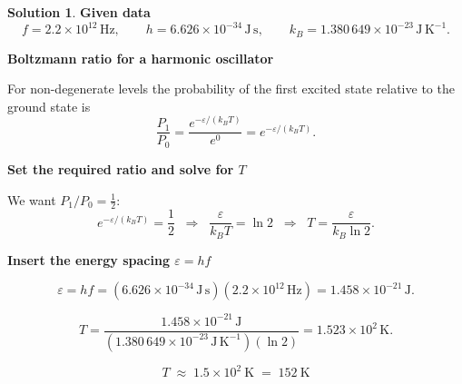 \documentclass[12pt]{article}
\theoremstyle{definition} %
\newtheorem{solution}{Solution}
\theoremstyle{plain} %
\begin{document}
  \begin{solution}
    \textbf{Given data}
    \[
    f = 2.2\times10^{12}\,\mathrm{Hz},
    \qquad
    h = 6.626\times10^{-34}\,\mathrm{J\,s},
    \qquad
    k_B = 1.380\,649\times10^{-23}\,\mathrm{J\,K^{-1}} .
    \]
    
    \medskip
    \textbf{Boltzmann ratio for a harmonic oscillator}
    
    For non-degenerate levels the probability of the first excited state
    relative to the ground state is
    \[
    \frac{P_1}{P_0}
       = \frac{e^{-\varepsilon/(k_BT)}}{e^{0}}
       = e^{-\varepsilon/(k_BT)} .
    \]
    
    \medskip
    \textbf{Set the required ratio and solve for \(T\)}
    
    We want \(P_1/P_0 = \tfrac12\):
    \[
    e^{-\varepsilon/(k_BT)} = \frac12
    \;\;\Longrightarrow\;\;
    \frac{\varepsilon}{k_BT} = \ln 2
    \;\;\Longrightarrow\;\;
    T = \frac{\varepsilon}{k_B\ln 2}.
    \]
    
    \medskip
    \textbf{Insert the energy spacing \(\varepsilon = hf\)}
    
    \[
    \varepsilon = h f
               = (6.626\times10^{-34}\,\mathrm{J\,s})
                 (2.2\times10^{12}\,\mathrm{Hz})
               = 1.458\times10^{-21}\,\mathrm{J}.
    \]
    
    \[
    T
      = \frac{1.458\times10^{-21}\,\mathrm{J}}
             {(1.380\,649\times10^{-23}\,\mathrm{J\,K^{-1}})(\ln 2)}
      = 1.523\times10^{2}\,\mathrm{K}.
    \]
    
    \[
    \boxed{T \;\approx\; 1.5\times10^{2}\ \text{K} \;=\; 152\ \text{K}}
    \]
    \end{solution}
\end{document}
